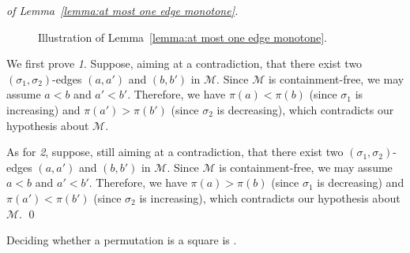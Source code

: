 \documentclass[a4paper]{llncs}
\begin{document}
\begin{proof}[of Lemma~\ref{lemma:at most one edge monotone}]
\begin{figure}[t!]
{
      \label{subfig:decreasing before and below increasing}
    }%
    \caption{\label{fig:subfig:no (nu_1, nu_2)-edge}%
      Illustration of Lemma~\ref{lemma:at most one edge monotone}.
    }
  \end{figure}
  We first prove \emph{1}.
  Suppose, aiming at a contradiction, that there exist two
  $(\sigma_1, \sigma_2)$-edges $(a, a')$ and $(b, b')$ in $\mathcal{M}$.
  Since $\mathcal{M}$ is containment-free, we may assume $a < b$ and $a' < b'$.
  Therefore, we have
  $\pi(a) < \pi(b)$ (since $\sigma_1$ is increasing) and
  $\pi(a') > \pi(b')$ (since $\sigma_2$ is decreasing),
  which contradicts our hypothesis about $\mathcal{M}$.

  As for \emph{2}, suppose, still aiming at a contradiction,
  that there exist two
  $(\sigma_1, \sigma_2)$-edges $(a, a')$ and $(b, b')$ in $\mathcal{M}$.
  Since $\mathcal{M}$ is containment-free, we may assume $a < b$ and $a' < b'$.
  Therefore, we have
  $\pi(a) > \pi(b)$ (since $\sigma_1$ is decreasing) and
  $\pi(a') < \pi(b')$ (since $\sigma_2$ is increasing),
  which contradicts our hypothesis about $\mathcal{M}$.
  \qed
\end{proof}

\begin{proposition}
  \label{proposition:hardness}
  Deciding whether a permutation is a square is \NPC.
\end{proposition}
\end{document}
